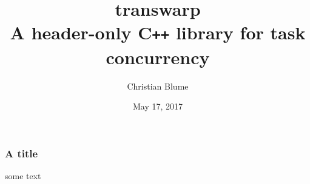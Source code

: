 \documentclass[11pt]{beamer}
\begin{document}
\title{transwarp \\ \vspace{0.2cm} \large A header-only C\texttt{++} library for task concurrency}  
\author{Christian Blume}
\date{May 17, 2017} 

\begin{frame}
\titlepage
\end{frame}

\begin{frame}[fragile]
\frametitle{A title}
some text
\end{frame}
\end{document}
